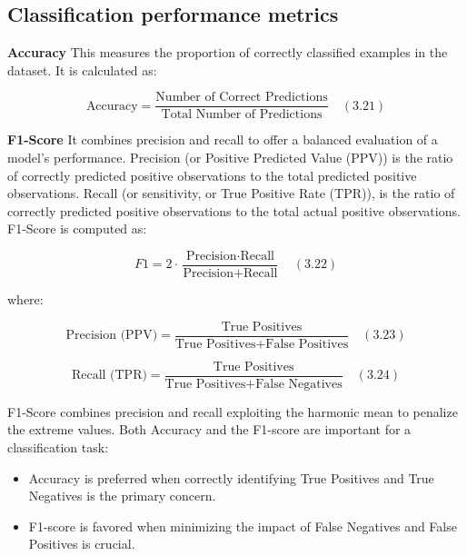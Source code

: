 \documentclass{Configuration_Files/PoliMi3i_thesis}
\begin{document}
\subsection{Classification performance metrics}

\textbf{Accuracy} \quad This measures the proportion of correctly classified examples in the dataset. It is calculated as:

\begin{equation}
\text{Accuracy} = \frac{\text{Number of Correct Predictions}}{\text{Total Number of Predictions}} \quad (3.21)
\end{equation}

\textbf{F1-Score} \quad It combines precision and recall to offer a balanced evaluation of a model’s performance. Precision (or Positive Predicted Value (PPV)) is the ratio of correctly predicted positive observations to the total predicted positive observations. Recall (or sensitivity, or True Positive Rate (TPR)), is the ratio of correctly predicted positive observations to the total actual positive observations. F1-Score is computed as:

\begin{equation}
F1 = 2 \cdot \frac{\text{Precision} \cdot \text{Recall}}{\text{Precision} + \text{Recall}} \quad (3.22)
\end{equation}

where:

\begin{equation}
\text{Precision (PPV)} = \frac{\text{True Positives}}{\text{True Positives} + \text{False Positives}} \quad (3.23)
\end{equation}

\begin{equation}
\text{Recall (TPR)} = \frac{\text{True Positives}}{\text{True Positives} + \text{False Negatives}} \quad (3.24)
\end{equation}

F1-Score combines precision and recall exploiting the harmonic mean to penalize the extreme values. Both Accuracy and the F1-score are important for a classification task:
\begin{itemize}
    \item Accuracy is preferred when correctly identifying True Positives and True Negatives is the primary concern.
    \item F1-score is favored when minimizing the impact of False Negatives and False Positives is crucial.
\end{itemize}
\end{document}
